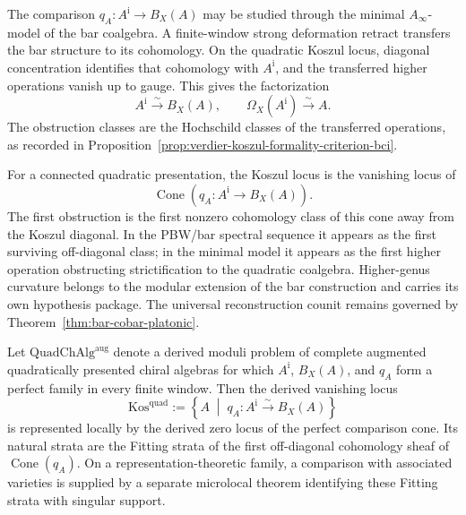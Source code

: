 \begin{remark}
\label{rem:bar-cobar-inversion-alt-formality}
The comparison \(q_A\colon A^{\mathrm i}\to B_X(A)\) may be studied
through the minimal \(A_\infty\)-model of the bar coalgebra.  A
finite-window strong deformation retract transfers the bar structure
to its cohomology.  On the quadratic Koszul locus, diagonal
concentration identifies that cohomology with \(A^{\mathrm i}\), and
the transferred higher operations vanish up to gauge.  This gives the
factorization
\[
A^{\mathrm i}\xrightarrow{\sim}B_X(A),
\qquad
\Omega_X(A^{\mathrm i})\xrightarrow{\sim}A.
\]
The obstruction classes are the Hochschild classes of the transferred
operations, as recorded in
Proposition~\ref{prop:verdier-koszul-formality-criterion-bci}.
\end{remark}

\begin{remark}
\label{rem:koszul-locus-off-locus-obstruction}
For a connected quadratic presentation, the Koszul locus is the
vanishing locus of
\[
\operatorname{Cone}\!\left(
q_A\colon A^{\mathrm i}\longrightarrow B_X(A)
\right).
\]
The first obstruction is the first nonzero cohomology class of this
cone away from the Koszul diagonal.  In the PBW/bar spectral sequence
it appears as the first surviving off-diagonal class; in the minimal
model it appears as the first higher operation obstructing
strictification to the quadratic coalgebra.  Higher-genus curvature
belongs to the modular extension of the bar construction and carries
its own hypothesis package.  The universal reconstruction counit
remains governed by Theorem~\ref{thm:bar-cobar-platonic}.
\end{remark}

\begin{conjecture}
\label{conj:koszul-wall-associated-variety}
Let \(\mathrm{QuadChAlg}^{\mathrm{aug}}\) denote a derived moduli
problem of complete augmented quadratically presented chiral
algebras for which \(A^{\mathrm i}\), \(B_X(A)\), and \(q_A\) form a
perfect family in every finite window.  Then the derived vanishing
locus
\[
\mathrm{Kos}^{\mathrm{quad}}
:=
\left\{A\;\middle|\;
q_A\colon A^{\mathrm i}\xrightarrow{\sim}B_X(A)\right\}
\]
is represented locally by the derived zero locus of the perfect
comparison cone.  Its natural strata are the Fitting strata of the
first off-diagonal cohomology sheaf of
\(\operatorname{Cone}(q_A)\).  On a representation-theoretic family,
a comparison with associated varieties is supplied by a separate
microlocal theorem identifying these Fitting strata with singular
support.
\end{conjecture}


